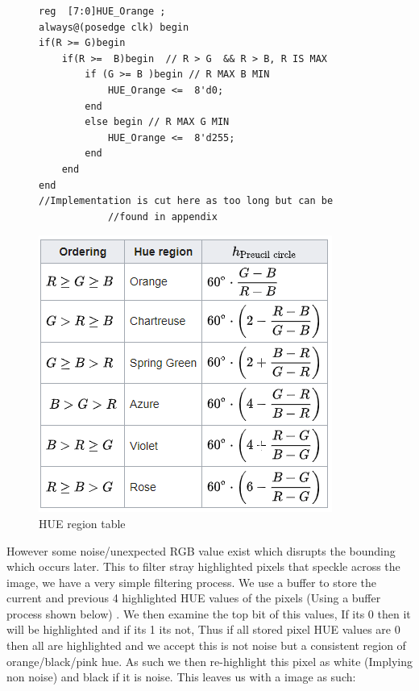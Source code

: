 \documentclass[10pt,twoside]{article}
\begin{document}
\begin{figure}[hbt]
\begin{minipage}{.54\textwidth}
\begin{verbatim}
reg  [7:0]HUE_Orange ; 
always@(posedge clk) begin
if(R >= G)begin 
	if(R >=  B)begin  // R > G  && R > B, R IS MAX
		if (G >= B )begin // R MAX B MIN
			HUE_Orange <=  8'd0; 
		end 
		else begin // R MAX G MIN
			HUE_Orange <=  8'd255; 
		end
	end
end
//Implementation is cut here as too long but can be 
            //found in appendix
\end{verbatim}
\end{minipage}
\begin{minipage}{.45\textwidth}
            \includegraphics[scale = 0.4]{HueRegions.PNG}
            \centering
            \caption{HUE region table}
            \label{fig:InitalDesign}
\end{minipage}
\end{figure}

However some noise/unexpected RGB value exist which disrupts the bounding which occurs later. This to filter stray highlighted pixels that speckle across the image, we have a very simple filtering process. We use a buffer to store the current and previous 4 highlighted HUE values of the pixels (Using a buffer process shown below) . We then examine the top bit of this values, If its 0 then it will be highlighted and if its 1 its not, Thus if all stored pixel HUE values are 0 then all are highlighted and we accept this is not noise but a consistent region of orange/black/pink hue. As such we then re-highlight this pixel as white (Implying non noise) and black if it is noise. This leaves us with a image as such:
\end{document}
